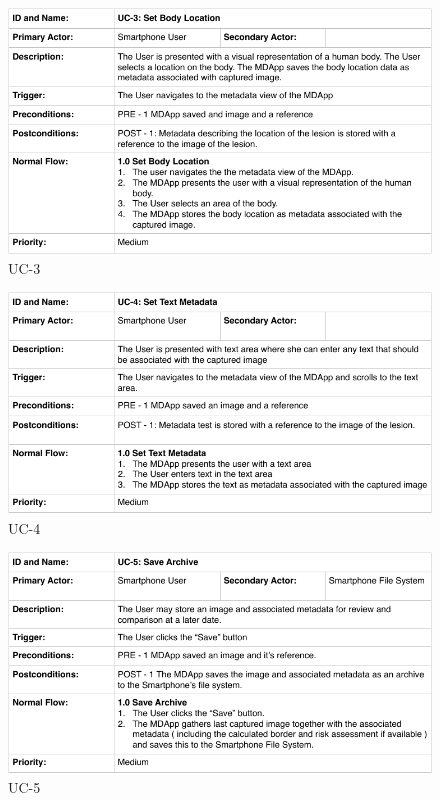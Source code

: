         \begin{figure}[H]
            \centering
            \includegraphics[width=\textwidth]{assets/requirements/uc/usecase_03.pdf}
            \caption{UC-3}
            \label{fig:uc-3}
        \end{figure}
        \begin{figure}[H]
            \centering
            \includegraphics[width=\textwidth]{assets/requirements/uc/usecase_04.pdf}
            \caption{UC-4}
            \label{fig:uc-4}
        \end{figure}
        \begin{figure}[H]
            \centering
            \includegraphics[width=\textwidth]{assets/requirements/uc/usecase_05.pdf}
            \caption{UC-5}
            \label{fig:uc-5}
        \end{figure}
